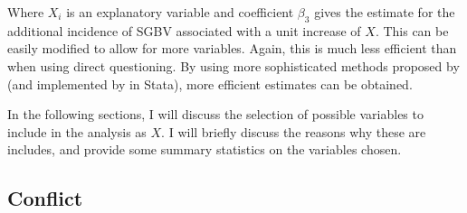 \documentclass[11pt,a4paper]{scrartcl} %
\newcommand{\tableloc}{C:/Users/Koen/Dropbox/PhD/Papers/CongoGBV/Tables}
\begin{document}
Where \(X_i\) is an explanatory variable and coefficient \(\beta_3\) gives the estimate for the additional incidence of SGBV associated with a unit increase of \(X\). This can be easily modified to allow for more variables. Again, this is much less efficient than when using direct questioning. By using more sophisticated methods proposed by \citet{Imai2011} (and implemented by \cite{Tsai2019} in Stata), more efficient estimates can be obtained. 

In the following sections, I will discuss the selection of possible variables to include in the analysis as $X$. I will briefly discuss the reasons why these are includes, and provide some summary statistics on the variables chosen.

\newcommand{\summstat}[2]{\csvreader[filter strcmp={\var}{#1}]{\tableloc/balance.csv}{var=\var,#2=\stat}{\stat}}


\subsection*{Conflict}
\end{document}
